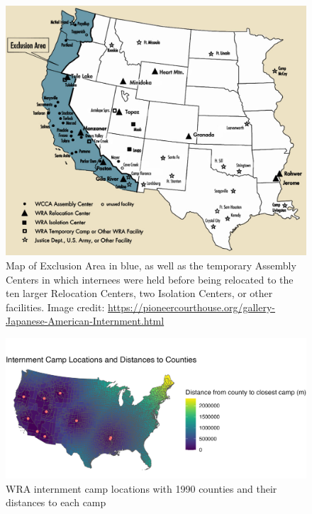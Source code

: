 \documentclass[12pt]{article}
\begin{document}
\begin{figure}
    \centering
    \includegraphics[width=1.0\textwidth]{figures/PioCrtInternmentMap.jpg}
    \caption{Map of Exclusion Area in blue, as well as the temporary Assembly Centers in which internees were held before being relocated to the ten larger Relocation Centers, two Isolation Centers, or other facilities. Image credit: \url{https://pioneercourthouse.org/gallery-Japanese-American-Internment.html}}
    \label{fig:internmentmap}
\end{figure}

\begin{figure}
    \centering
    \includegraphics[width=1.0\textwidth]{figures/countymap.png}
    \caption{WRA internment camp locations with 1990 counties and their distances to each camp}
    \label{fig:countymap}
\end{figure}
\end{document}
